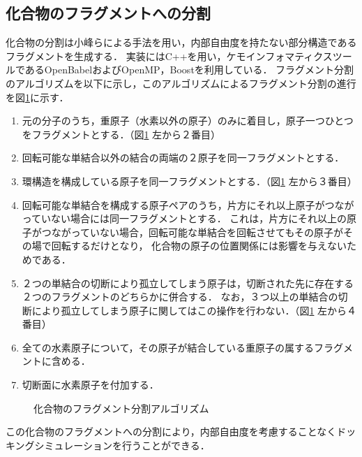 \subsection{化合物のフラグメントへの分割}\label{subsec:decomposition}
化合物の分割は小峰らによる手法\cite{Shunta2015}を用い，内部自由度を持たない部分構造であるフラグメントを生成する．
実装にはC++を用い，ケモインフォマティクスツールであるOpenBabel\cite{OBoyle2011}およびOpenMP，Boostを利用している．
フラグメント分割のアルゴリズムを以下に示し，このアルゴリズムによるフラグメント分割の進行を図\ref{fig:decomposition}に示す．
\begin{enumerate} 
\item 元の分子のうち，重原子（水素以外の原子）のみに着目し，原子一つひとつをフラグメントとする．（図\ref{fig:decomposition} 左から２番目）
\item 回転可能な単結合以外の結合の両端の２原子を同一フラグメントとする．
\item 環構造を構成している原子を同一フラグメントとする．（図\ref{fig:decomposition} 左から３番目）
\item 回転可能な単結合を構成する原子ペアのうち，片方にそれ以上原子がつながっていない場合には同一フラグメントとする．
	これは，片方にそれ以上の原子がつながっていない場合，回転可能な単結合を回転させてもその原子がその場で回転するだけとなり，
	化合物の原子の位置関係には影響を与えないためである．
\item ２つの単結合の切断により孤立してしまう原子は，切断された先に存在する２つのフラグメントのどちらかに併合する．
	なお，３つ以上の単結合の切断により孤立してしまう原子に関してはこの操作を行わない．（図\ref{fig:decomposition} 左から４番目）
\item 全ての水素原子について，その原子が結合している重原子の属するフラグメントに含める．
\item 切断面に水素原子を付加する．
\end{enumerate}
\begin{figure}[htp]
 \begin{center}
  \caption{化合物のフラグメント分割アルゴリズム\cite{Shunta2015}}
  \label{fig:decomposition}
 \end{center}
\end{figure}
この化合物のフラグメントへの分割により，内部自由度を考慮することなくドッキングシミュレーションを行うことができる．

